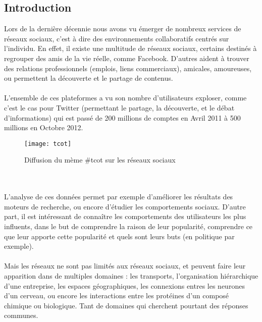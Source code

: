\begin{titlepage}

\newpage
\begin{center}
\begin{bf}
\section{Introduction}
\end{bf}
\end{center}

\vspace{1cm}
{
Lors de la dernière décennie nous avons vu émerger de nombreux services de réseaux sociaux, c'est à dire des environnements collaboratifs centrés sur l'individu. En effet, il existe une multitude de réseaux sociaux, certains destinés à regrouper des amis de la vie réelle, comme Facebook. D'autres aident à trouver des relations professionnels (emplois, liens commerciaux), amicales, amoureuses, ou permettent la découverte et le partage de contenus.
\\ \\
L'ensemble de ces plateformes a vu son nombre d'utilisateurs exploser, comme c'est le cas pour Twitter (permettant le partage, la découverte, et le débat d'informations) qui est passé de  200 millions de comptes en Avril 2011 à 500 millions en Octobre 2012.
\begin{figure}[h]
\centering
\texttt{[image: tcot]}
\caption{Diffusion du mème \#tcot sur les réseaux sociaux}
\end{figure}
\\ \\
L'analyse de ces données permet par exemple d'améliorer les résultats des moteurs de recherche, ou encore d'étudier les comportements sociaux. D'autre part, il est intéressant de connaître les comportements des utilisateurs les plus influents, dans le but de comprendre la raison de leur popularité, comprendre ce que leur apporte cette popularité et quels sont leurs buts (en politique par exemple).
\\ \\
Mais les réseaux ne sont pas limités aux réseaux sociaux, et peuvent faire leur apparition dans de multiples domaines : les transports, l'organisation hiérarchique d'une entreprise, les espaces géographiques, les connexions entres les neurones d'un cerveau, ou encore les interactions entre les protéines d'un composé chimique ou biologique. Tant de domaines qui cherchent pourtant des réponses communes.
}
\end{titlepage}

